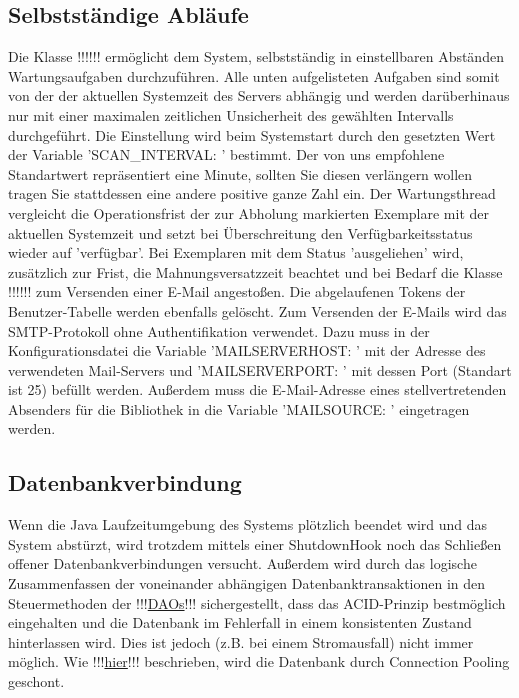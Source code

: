 \documentclass{article}
\begin{document}
\subsection{Selbstständige Abläufe}
Die Klasse !!!\hyperlink{Wartungsthread}{}!!! ermöglicht dem System, selbstständig in einstellbaren Abständen Wartungsaufgaben durchzuführen. Alle unten aufgelisteten Aufgaben sind somit von der der aktuellen Systemzeit des Servers abhängig und werden darüberhinaus nur mit einer maximalen zeitlichen Unsicherheit des gewählten Intervalls durchgeführt. Die Einstellung wird beim Systemstart durch den gesetzten Wert der Variable 'SCAN\_INTERVAL: ' bestimmt. Der von uns empfohlene Standartwert repräsentiert eine Minute, sollten Sie diesen verlängern wollen tragen Sie stattdessen eine andere positive ganze Zahl ein. Der Wartungsthread vergleicht die Operationsfrist der zur Abholung markierten Exemplare mit der aktuellen Systemzeit und setzt bei Überschreitung den Verfügbarkeitsstatus wieder auf 'verfügbar'. Bei Exemplaren mit dem Status 'ausgeliehen' wird, zusätzlich zur Frist, die Mahnungsversatzzeit beachtet und bei Bedarf die Klasse !!!\hyperlink{Email}{}!!! zum Versenden einer E-Mail angestoßen. Die abgelaufenen Tokens der Benutzer-Tabelle werden ebenfalls gelöscht. Zum Versenden der E-Mails wird das SMTP-Protokoll ohne Authentifikation verwendet. Dazu muss in der Konfigurationsdatei die Variable 'MAILSERVERHOST: ' mit der Adresse des verwendeten Mail-Servers und 'MAILSERVERPORT: ' mit dessen Port (Standart ist 25) befüllt werden. Außerdem muss die E-Mail-Adresse eines stellvertretenden Absenders für die Bibliothek in die Variable 'MAILSOURCE: ' eingetragen werden.
\subsection{Datenbankverbindung} 
Wenn die Java Laufzeitumgebung des Systems plötzlich beendet wird und das System abstürzt, wird trotzdem mittels einer ShutdownHook noch das Schließen offener Datenbankverbindungen versucht. Außerdem wird durch das logische Zusammenfassen der voneinander abhängigen Datenbanktransaktionen in den Steuermethoden der !!!\hyperlink{}{DAOs}!!! sichergestellt, dass das ACID-Prinzip bestmöglich eingehalten und die Datenbank im Fehlerfall in einem konsistenten Zustand hinterlassen wird. Dies ist jedoch (z.B. bei einem Stromausfall) nicht immer möglich. Wie !!!\hyperlink{Pooling}{hier}!!! beschrieben, wird die Datenbank durch Connection Pooling geschont.
\end{document}
